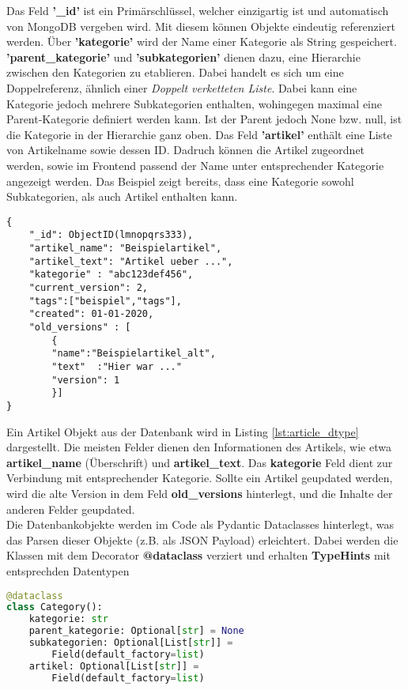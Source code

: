 Das Feld \textbf{'\_id'} ist ein Primärschlüssel, welcher einzigartig ist und automatisch von MongoDB vergeben wird. 
Mit diesem können Objekte eindeutig referenziert werden.
Über \textbf{'kategorie'} wird der Name einer Kategorie als String gespeichert.
\textbf{'parent\_kategorie'} und \textbf{'subkategorien'} dienen dazu, eine Hierarchie zwischen den Kategorien zu etablieren. Dabei handelt es sich um eine Doppelreferenz, ähnlich einer \textit{Doppelt verketteten Liste}.
Dabei kann eine Kategorie jedoch mehrere Subkategorien enthalten, wohingegen maximal eine Parent-Kategorie definiert werden kann.
Ist der Parent jedoch None bzw. null, ist die Kategorie in der Hierarchie ganz oben.
Das Feld \textbf{'artikel'} enthält eine Liste von Artikelname sowie dessen ID. 
Dadruch können die Artikel zugeordnet werden, sowie im Frontend passend der Name unter entsprechender Kategorie angezeigt werden.
Das Beispiel zeigt bereits, dass eine Kategorie sowohl Subkategorien, als auch Artikel enthalten kann. \\

\begin{lstlisting}[caption={Artikel Objekt},captionpos=b,showstringspaces=false, basicstyle=\small,label={lst:article_dtype}]
{
    "_id": ObjectID(lmnopqrs333),
    "artikel_name": "Beispielartikel",
    "artikel_text": "Artikel ueber ...",
    "kategorie" : "abc123def456",
    "current_version": 2,
    "tags":["beispiel","tags"],
    "created": 01-01-2020,
    "old_versions" : [
        {
        "name":"Beispielartikel_alt",
        "text"  :"Hier war ..."
        "version": 1
        }]
}
\end{lstlisting}

Ein Artikel Objekt aus der Datenbank wird in Listing \ref{lst:article_dtype} dargestellt.
Die meisten Felder dienen den Informationen des Artikels, wie etwa \textbf{artikel\_name} (Überschrift) und \textbf{artikel\_text}.
Das \textbf{kategorie} Feld dient zur Verbindung mit entsprechender Kategorie.
Sollte ein Artikel geupdated werden, wird die alte Version in dem Feld \textbf{old\_versions} hinterlegt, und die Inhalte der anderen Felder geupdated.\\

Die Datenbankobjekte werden im Code als Pydantic Dataclasses hinterlegt, was das Parsen dieser Objekte (z.B. als JSON Payload) erleichtert. 
Dabei werden die Klassen mit dem Decorator \textbf{@dataclass} verziert und erhalten \textbf{TypeHints} mit entsprechden Datentypen

\begin{lstlisting}[language=python,caption={Kategorie Dataclass},captionpos=b,showstringspaces=false, basicstyle=\small,label={lst:dataclass}]
@dataclass
class Category():
    kategorie: str
    parent_kategorie: Optional[str] = None
    subkategorien: Optional[List[str]] =
        Field(default_factory=list)
    artikel: Optional[List[str]] =
        Field(default_factory=list)
\end{lstlisting}

